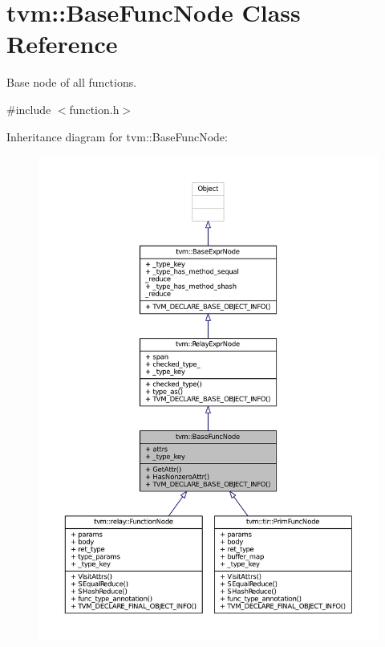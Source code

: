 \hypertarget{classtvm_1_1BaseFuncNode}{}\section{tvm\+:\+:Base\+Func\+Node Class Reference}
\label{classtvm_1_1BaseFuncNode}


Base node of all functions.  




{\ttfamily \#include $<$function.\+h$>$}



Inheritance diagram for tvm\+:\+:Base\+Func\+Node\+:
\nopagebreak
\begin{figure}[H]
\begin{center}
\leavevmode
\includegraphics[width=350pt]{classtvm_1_1BaseFuncNode__inherit__graph}
\end{center}
\end{figure}


